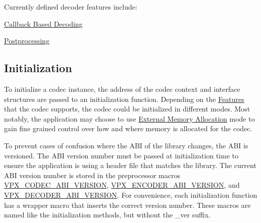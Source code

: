 Currently defined decoder features include\-:
\begin{DoxyItemize}
\item \hyperlink{usage_decode_usage_cb}{Callback Based Decoding}
\item \hyperlink{usage_decode_usage_postproc}{Postprocessing}
\end{DoxyItemize}\hypertarget{usage_usage_init}{}\subsection{Initialization}\label{usage_usage_init}
To initialize a codec instance, the address of the codec context and interface structures are passed to an initialization function. Depending on the \hyperlink{usage_usage_features}{Features} that the codec supports, the codec could be initialized in different modes. Most notably, the application may choose to use \hyperlink{usage_xma}{External Memory Allocation} mode to gain fine grained control over how and where memory is allocated for the codec.

To prevent cases of confusion where the A\-B\-I of the library changes, the A\-B\-I is versioned. The A\-B\-I version number must be passed at initialization time to ensure the application is using a header file that matches the library. The current A\-B\-I version number is stored in the preprocessor macros \hyperlink{group__codec_gaf7e9cad2df0f81679b881f46740ad097}{V\-P\-X\-\_\-\-C\-O\-D\-E\-C\-\_\-\-A\-B\-I\-\_\-\-V\-E\-R\-S\-I\-O\-N}, \hyperlink{group__encoder_gaa4f0b52293c08ba672429c3a03648b9d}{V\-P\-X\-\_\-\-E\-N\-C\-O\-D\-E\-R\-\_\-\-A\-B\-I\-\_\-\-V\-E\-R\-S\-I\-O\-N}, and \hyperlink{group__decoder_ga462b459e7ae13937e1eae1776245db12}{V\-P\-X\-\_\-\-D\-E\-C\-O\-D\-E\-R\-\_\-\-A\-B\-I\-\_\-\-V\-E\-R\-S\-I\-O\-N}. For convenience, each initialization function has a wrapper macro that inserts the correct version number. These macros are named like the initialization methods, but without the \-\_\-ver suffix.

